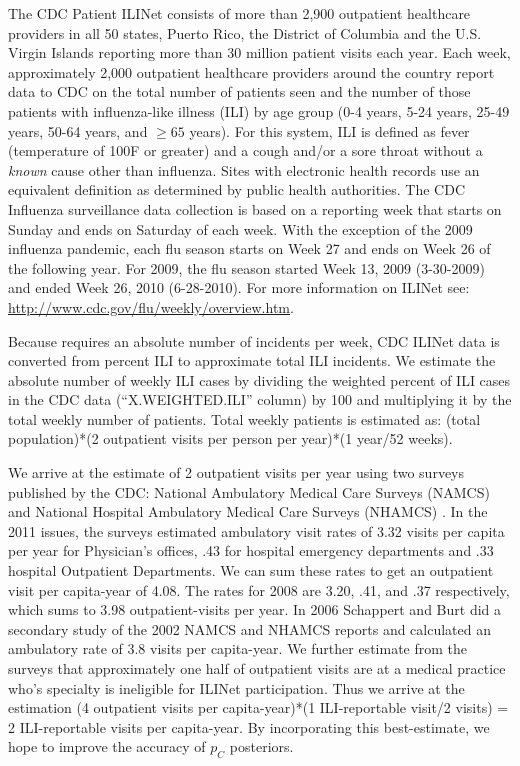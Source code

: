 \documentclass[a4paper]{article}
\begin{document}
The CDC Patient ILINet consists of more than 2,900 outpatient healthcare providers in all 50 states, Puerto Rico, the District of Columbia and the U.S. Virgin Islands reporting more than 30 million patient visits each year. Each week, approximately 2,000 outpatient healthcare providers around the country report data to CDC on the total number of patients seen and the number of those patients with influenza-like illness (ILI) by age group (0-4 years, 5-24 years, 25-49 years, 50-64 years, and $\geq65$ years). For this system, ILI is defined as fever (temperature of 100F or greater) and a cough and/or a sore throat without a \textit{known} cause other than influenza.  Sites with electronic health records use an equivalent definition as
determined by public health authorities.  The CDC Influenza surveillance data collection is based on a reporting week that starts on Sunday and ends on Saturday of each week.  With the exception of the 2009 influenza pandemic, each flu season starts on Week 27 and ends on Week 26 of the following year.  For 2009, the flu season started Week 13, 2009 (3-30-2009) and ended Week 26, 2010 (6-28-2010). For more information on ILINet see: \url{http://www.cdc.gov/flu/weekly/overview.htm}.

Because  requires an absolute number of incidents per week, CDC ILINet data is converted from percent ILI to approximate total ILI incidents.  We estimate the absolute number of weekly ILI cases by dividing the weighted percent of ILI cases in the CDC data (``X.WEIGHTED.ILI'' column) by 100 and multiplying it by the total weekly number of patients.  Total weekly patients is estimated as: (total population)*(2 outpatient visits per person per year)*(1 year/52 weeks).

We arrive at the estimate of 2 outpatient visits per year using two surveys published by the CDC: National Ambulatory Medical Care Surveys (NAMCS) \cite{namcs2011} and National Hospital Ambulatory Medical Care Surveys (NHAMCS) \cite{nhamcs2011}.  In the 2011 issues, the surveys estimated ambulatory visit rates of 3.32 visits per capita per year for Physician's offices, .43 for hospital emergency departments and .33 hospital Outpatient Departments.  We can sum these rates to get an outpatient visit per capita-year of 4.08. The rates for 2008 are 3.20, .41, and .37 respectively, which sums to 3.98 outpatient-visits per year.  In 2006 Schappert and Burt did a secondary study \cite{schappert2006} of the 2002 NAMCS and NHAMCS reports and calculated an ambulatory rate of 3.8 visits per capita-year. We further estimate from the surveys that approximately one half of outpatient visits are at a medical practice who's specialty is ineligible for ILINet participation.  Thus we arrive at the estimation (4 outpatient visits per capita-year)*(1 ILI-reportable visit/2 visits) = 2 ILI-reportable visits per capita-year.  By incorporating this best-estimate, we hope to improve the accuracy of $p_C$ posteriors.
\end{document}
